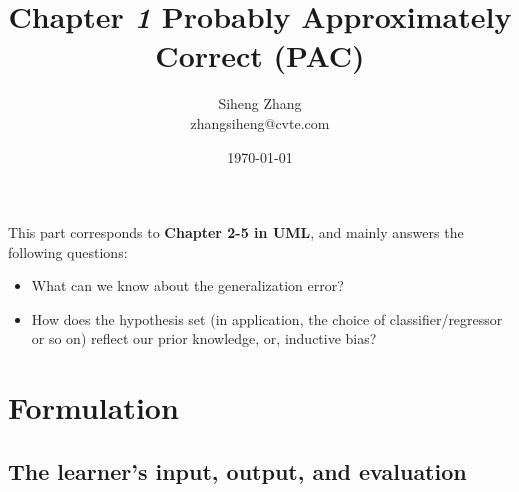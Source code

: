 \documentclass{article}
\author{Siheng Zhang\\zhangsiheng@cvte.com}
\title{Chapter \textbf{\textit{1}} Probably Approximately Correct (PAC)}
\date{\today}
\begin{document}
\maketitle  


This part corresponds to \textbf{Chapter 2-5 in UML}, and mainly answers the following questions:

\begin{itemize}
\item What can we know about the generalization error?
\item How does the hypothesis set (in application, the choice of classifier/regressor or so on) reflect our prior knowledge, or, inductive bias?
\end{itemize}

\tableofcontents
\newpage

\section{Formulation}

\subsection{The learner's input, output, and evaluation}
\end{document}
